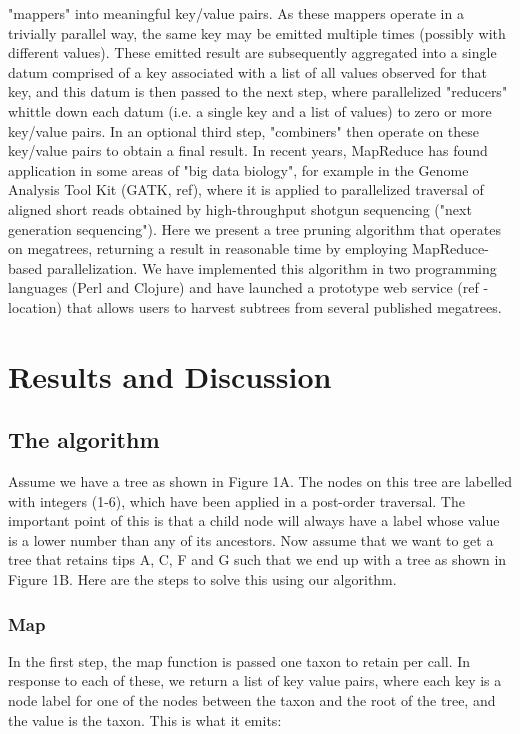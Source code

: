 \documentclass[10pt]{bmc_article}
\newenvironment{bmcformat}{\begin{raggedright}\baselineskip20pt\sloppy\setboolean{publ}{false}}{\end{raggedright}\baselineskip20pt\sloppy}
\begin{document}
\begin{bmcformat}
"mappers" into meaningful key/value pairs. As these mappers operate in a trivially parallel way, the same key may be emitted multiple times (possibly with different values). These emitted result are subsequently aggregated into a single datum comprised of a key associated with a list of all values observed for that key, and this datum is then passed to the next step, where parallelized "reducers" whittle down each datum (i.e. a single key and a list of values) to zero or more key/value pairs. In an optional third step, 
"combiners" then operate on these key/value pairs to obtain a final result. In recent years, MapReduce has found application in some areas of "big data
biology", for example in the Genome Analysis Tool Kit (GATK, ref), where it is applied to parallelized traversal of aligned short reads obtained by high-throughput shotgun sequencing ("next generation sequencing"). Here we present a tree pruning algorithm that operates on megatrees, returning a result in reasonable time by employing MapReduce-based parallelization. We have implemented this algorithm in two programming languages (Perl and Clojure) and have launched a prototype web service (ref - location) that allows users to harvest subtrees from several published megatrees.

\section*{Results and Discussion}

  \subsection*{The algorithm}
	Assume we have a tree as shown in Figure 1A. The nodes on this tree are labelled with integers (1-6), which have been applied in a post-order 
	traversal. The important point of this is that a child node will always 
	have a label whose value is a lower number than any of its ancestors. Now
	assume that we want to get a tree that retains tips A, C, F and G such
	that we end up with a tree as shown in Figure 1B. Here are the steps to
	solve this using our algorithm.
	\subsubsection*{Map}
		In the first step, the map function is passed one taxon to retain 
		per call. In response to each of these, we return a list of key value 
		pairs, where each key is a node label for one of the nodes between 
		the taxon and the root of the tree, and the value is the taxon. 
		This is what it emits:


\end{bmcformat}
\end{document}
